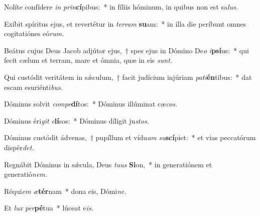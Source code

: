 \item Nolíte confídere \textit{in} \textit{prin}\textbf{cí}pibus:~* in fíliis hóminum, in quibus non est sa\textit{lus.}
\item Exíbit spíritus ejus, et revertétur in \textit{ter}\textit{ram} \textbf{su}am:~* in illa die períbunt omnes cogitatiónes eó\textit{rum.}
\item Beátus cujus Deus Jacob adjútor ejus,~† spes ejus in Dómino De\textit{o} \textit{i}\textbf{psí}us:~* qui fecit cælum et terram, mare et ómnia, quæ in eis \textit{sunt.}
\item Qui custódit veritátem in sǽculum,~† facit judícium injúriam \textit{pa}\textit{ti}\textbf{én}tibus:~* dat escam esuriénti\textit{bus.}
\item Dóminus solvit \textit{com}\textit{pe}\textbf{dí}tos:~* Dóminus illúminat cæ\textit{cos.}
\item Dóminus éri\textit{git} \textit{e}\textbf{lí}sos:~* Dóminus díligit ju\textit{stos.}
\item Dóminus custódit ádvenas,~† pupíllum et vídu\textit{am} \textit{su}\textbf{scí}piet:~* et vias peccatórum dispér\textit{det.}
\item Regnábit Dóminus in sǽcula, Deus \textit{tu}\textit{us} \textbf{Si}on,~* in generatiónem et generatió\textit{nem.}
\item Réqui\textit{em} \textit{æ}\textbf{tér}nam~* dona eis, Dómi\textit{ne.}
\item Et \textit{lux} \textit{per}\textbf{pé}tua~* lúceat e\textit{is.}